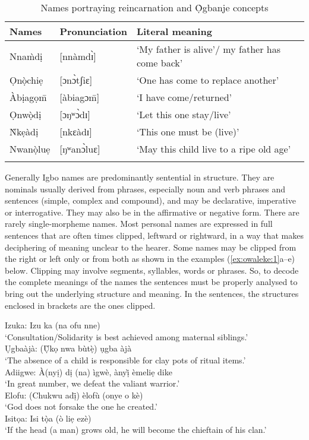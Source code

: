 \documentclass[output=paper]{langscibook}
\begin{document}
\begin{table}
\caption{\label{tab:owaleke:3.7} Names portraying reincarnation and Ọ̀gbanje concepts }
\begin{tabularx}{\textwidth}{llQ}
\lsptoprule
Names                & Pronunciation                & Literal meaning\\
\midrule
Nnam̀dị       &    [nnàmdɪ̀]   &   ‘My father is alive’/ my father has come back’\\
Ọnọ̀chiẹ      &    [ɔnɔ̀tʃiɛ]    &  ‘One has come to replace another’\\
Àbịagọm̄     &   {[}àbiagɔm̄{]}  &  ‘I have come/returned’\\
Ọnwọ̀dị      &    [ɔŋʷɔ̀dɪ]	& ‘Let this one stay/live’\\
Ǹkẹàdị       &    [nkɛàdɪ]      &  ‘This one must be (live)’\\
Nwanọ̀luẹ    &  [ŋʷanɔ̀luɛ]  & ‘May this child live to a ripe old age’\\
\lspbottomrule
\end{tabularx}
\end{table}

Generally Igbo names are predominantly sentential in structure. They are nominals usually derived from phrases, especially noun and verb phrases and sentences (simple, complex and compound), and may be declarative, imperative or interrogative. They may also be in the affirmative or negative form.  There are rarely single-morpheme names. Most personal names are expressed in full sentences that are often times clipped, leftward or rightward, in a way that makes deciphering of meaning unclear to the hearer. Some names may be clipped from the right or left only or from both as shown in the examples (\ref{ex:owaleke:1}a--e) below. Clipping may involve segments, syllables, words or phrases. So, to decode the complete meanings of the names the sentences must be properly analysed to bring out the underlying structure and meaning. In the sentences, the structures enclosed in brackets are the ones clipped.

\ea\label{ex:owaleke:1}
\ea
Izuka:  Izu ka (na ofu nne) \\
\glt `Consultation/Solidarity is best achieved among maternal siblings.'\\
\ex
Ụgbaàjà: (Ụ̀kọ nwa bùtẹ̀)  ụgba àjà\\
\glt `The absence of a child is responsible for clay pots of ritual items.'\\
\ex
  Adiigwe: À(nyị) dị (na) ìgwè, ànyị̀ èmeliẹ dike\\
\glt `In great number, we defeat the valiant warrior.'\\
\ex
  Elofu:   (Chukwu adị̄) èlofù (onye o kè)   \\
\glt `God does not forsake the one he created.'\\
\ex
  Isitọa:   Isi tọ̀a (ò liẹ ezè) \\
\glt `If the head (a man) grows old, he will become the chieftain of his clan.'\\
\z
\z
\end{document}
